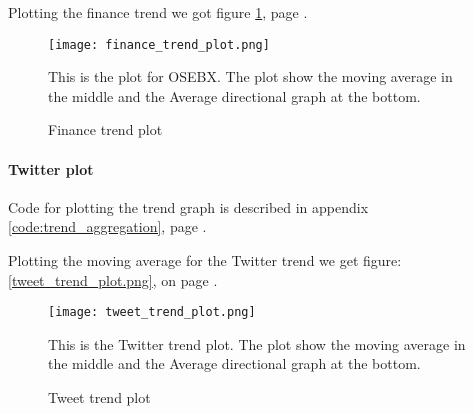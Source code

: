 Plotting the finance trend we got figure \ref{fig:trend_finance_plot}, page
\pageref{fig:trend_finance_plot}.
\begin{figure}[htb]
    \centering
    \texttt{[image: finance\_trend\_plot.png]}
    \label{fig:trend_finance_plot}
    \caption{Finance trend plot}
This is the plot for OSEBX. The plot show the moving average in the middle and
the Average directional graph at the bottom.
\end{figure}


\paragraph{Twitter plot}
Code for plotting the trend graph is described in appendix
\ref{code:trend_aggregation}, page \pageref{code:trend_aggregation}.

Plotting the moving average for the Twitter trend we get figure: \ref{tweet_trend_plot.png}, on page
\pageref{tweet_trend_plot.png}.

\begin{figure}[htb]
    \texttt{[image: tweet\_trend\_plot.png]}
    \label{fig:trend_tweet_plot}
    \caption{Tweet trend plot}
This is the Twitter trend plot. The plot show the moving average in the middle
and the Average directional graph at the bottom.
\end{figure}
%

